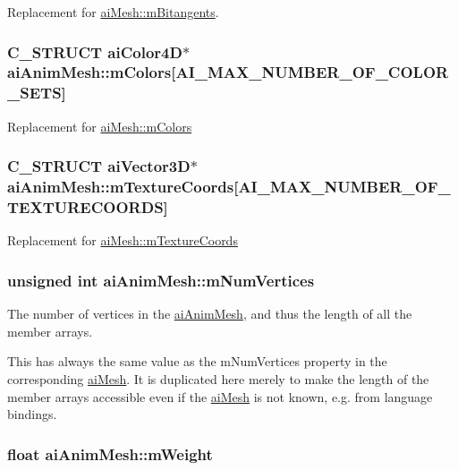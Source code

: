 Replacement for \hyperlink{structai_mesh_b2a81bfe1731f01271ebab274a8f01c4}{aiMesh::mBitangents}. \hypertarget{structai_anim_mesh_4f062d9fac71c6b367fdf0f8638e1ca5}{
\subsubsection[mColors]{\setlength{\rightskip}{0pt plus 5cm}C\_\-STRUCT aiColor4D$\ast$ {\bf aiAnimMesh::mColors}\mbox{[}AI\_\-MAX\_\-NUMBER\_\-OF\_\-COLOR\_\-SETS\mbox{]}}}
\label{structai_anim_mesh_4f062d9fac71c6b367fdf0f8638e1ca5}


Replacement for \hyperlink{structai_mesh_d9215f67bd0c2277b10775a8adb66b96}{aiMesh::mColors} \hypertarget{structai_anim_mesh_d24a0451adeb845a53eb2351b9462e0a}{
\subsubsection[mTextureCoords]{\setlength{\rightskip}{0pt plus 5cm}C\_\-STRUCT aiVector3D$\ast$ {\bf aiAnimMesh::mTextureCoords}\mbox{[}AI\_\-MAX\_\-NUMBER\_\-OF\_\-TEXTURECOORDS\mbox{]}}}
\label{structai_anim_mesh_d24a0451adeb845a53eb2351b9462e0a}


Replacement for \hyperlink{structai_mesh_4a50b11d00ef50f419c75cab0f6bddd6}{aiMesh::mTextureCoords} \hypertarget{structai_anim_mesh_6bb0d45317a1bbea7f2b7f8191d0c436}{
\subsubsection[mNumVertices]{\setlength{\rightskip}{0pt plus 5cm}unsigned int {\bf aiAnimMesh::mNumVertices}}}
\label{structai_anim_mesh_6bb0d45317a1bbea7f2b7f8191d0c436}


The number of vertices in the \hyperlink{structai_anim_mesh}{aiAnimMesh}, and thus the length of all the member arrays.

This has always the same value as the mNumVertices property in the corresponding \hyperlink{structai_mesh}{aiMesh}. It is duplicated here merely to make the length of the member arrays accessible even if the \hyperlink{structai_mesh}{aiMesh} is not known, e.g. from language bindings. \hypertarget{structai_anim_mesh_3554843cf6bb042369be1e75a2eff88a}{
\subsubsection[mWeight]{\setlength{\rightskip}{0pt plus 5cm}float {\bf aiAnimMesh::mWeight}}}
\label{structai_anim_mesh_3554843cf6bb042369be1e75a2eff88a}


